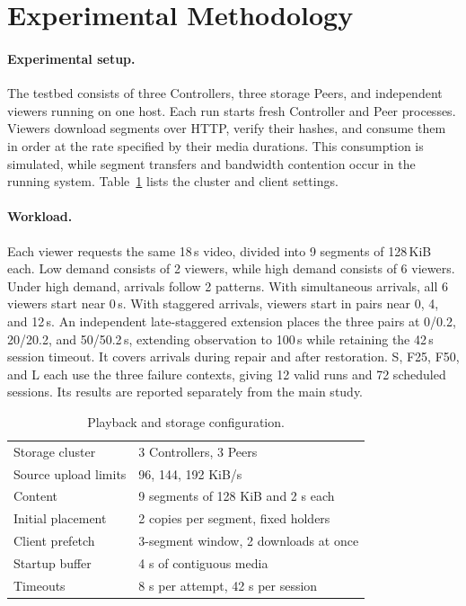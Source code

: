 \section{Experimental Methodology}
\label{sec:method}

\paragraph{Experimental setup.}
The testbed consists of three Controllers, three storage Peers, and
independent viewers running on one host. Each run starts fresh Controller
and Peer processes. Viewers download segments over HTTP, verify their
hashes, and consume them in order at the rate specified by their media
durations. This consumption is simulated, while segment transfers and
bandwidth contention occur in the running system.
Table~\ref{tab:fixture} lists the cluster and client settings.

\paragraph{Workload.}
Each viewer requests the same 18\,s video, divided into 9 segments of 128\,KiB each.
Low demand consists of 2 viewers, while high demand consists of 6 viewers. 
Under high demand, arrivals follow 2 patterns.
With simultaneous arrivals, all 6 viewers start near 0\,s. 
With staggered arrivals, viewers start in pairs near 0, 4, and 12\,s. 
An independent late-staggered extension places the three pairs at
0/0.2, 20/20.2, and 50/50.2\,s, extending observation to 100\,s while
retaining the 42\,s session timeout. It covers arrivals during repair and
after restoration. S, F25, F50, and L each use the three failure contexts,
giving 12 valid runs and 72 scheduled sessions. Its results are reported
separately from the main study.

\begin{table}[ht]
\centering\small
\caption{Playback and storage configuration.}
\label{tab:fixture}
\begin{tabular}{@{}ll@{}}
\toprule
Storage cluster & 3 Controllers, 3 Peers \\
Source upload limits & 96, 144, 192 KiB/s \\
Content & 9 segments of 128 KiB and 2 s each \\
Initial placement & 2 copies per segment, fixed holders \\
Client prefetch & 3-segment window, 2 downloads at once \\
Startup buffer & 4 s of contiguous media \\
Timeouts & 8 s per attempt, 42 s per session \\
\bottomrule
\end{tabular}
\end{table}


